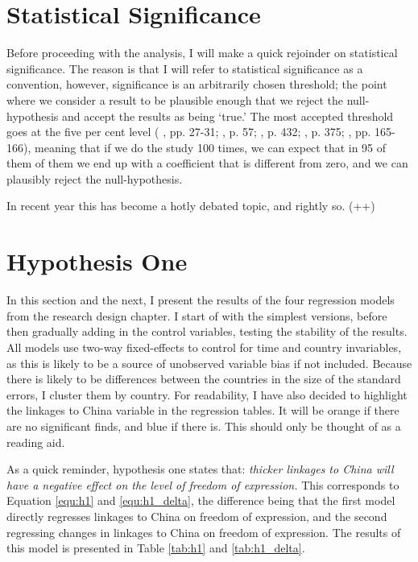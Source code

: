 \section{Statistical Significance}
Before proceeding with the analysis, I will make a quick rejoinder on statistical significance. The reason is that I will refer to statistical significance as a convention, however, significance is an arbitrarily chosen threshold; the point where we consider a result to be plausible enough that we reject the null-hypothesis and accept the results as being `true.' The most accepted threshold goes at the five per cent level (\citeauthor{christophersen_introduksjon_2018} \citeyear{christophersen_introduksjon_2018}, pp. 27-31; \citeauthor{gelman_regression_2021} \citeauthor{gelman_regression_2021}, p. 57; \citeauthor{halperin_political_2020} \citeyear{halperin_political_2020},  p. 432; \citeauthor{hellevik_forskningsmetode_2002} \citeyear{hellevik_forskningsmetode_2002}, p. 375; \citeauthor{kellstedt_fundamentals_2018} \citeyear{kellstedt_fundamentals_2018}, pp. 165-166), meaning that if we do the study 100 times, we can expect that in 95 of them of them we end up with a coefficient that is different from zero, and we can plausibly reject the null-hypothesis.

In recent year this has become a hotly debated topic, and rightly so. (++)

\section{Hypothesis One} \label{sec:h1}
In this section and the next, I present the results of the four regression models from the research design chapter. I start of with the simplest versions, before then gradually adding in the control variables, testing the stability of the results. All models use two-way fixed-effects to control for time and country invariables, as this is likely to be a source of unobserved variable bias if not included. Because there is likely to be differences between the countries in the size of the standard errors, I cluster them by country. For readability, I have also decided to highlight the linkages to China variable in the regression tables. It will be orange if there are no significant finds, and blue if there is. This should only be thought of as a reading aid. 

As a quick reminder, hypothesis one states that: \textit{thicker linkages to China will have a negative effect on the level of freedom of expression.} This corresponds to Equation \ref{equ:h1} and \ref{equ:h1_delta}, the difference being that the first model directly regresses linkages to China on freedom of expression, and the second regressing changes in linkages to China on freedom of expression. The results of this model is presented in Table \ref{tab:h1} and \ref{tab:h1_delta}. 

